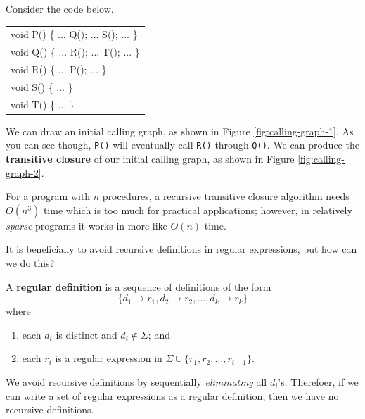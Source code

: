 \begin{example}
    Consider the code below.
    \begin{center}
        \ttfamily
        \begin{tabular}{l}
            \toprule
            void P() \{ ... Q(); ... S(); ... \} \\
            void Q() \{ ... R(); ... T(); ... \} \\
            void R() \{ ... P(); ... \} \\
            void S() \{ ... \} \\
            void T() \{ ... \} \\
            \bottomrule
        \end{tabular}
    \end{center}
    We can draw an initial calling graph, as shown in Figure 
    \ref{fig:calling-graph-1}.
    As you can see though, \texttt{P()} will eventually call \texttt{R()}
    through \texttt{Q()}.
    We can produce the \textbf{transitive closure} of our initial calling graph,
    as shown in Figure \ref{fig:calling-graph-2}.
\end{example}

For a program with $n$ procedures, a recursive transitive closure algorithm
needs $O(n^3)$ time which is too much for practical applications;
however, in relatively \emph{sparse} programs it works in more like $O(n)$
time.

It is beneficially to avoid recursive definitions in regular expressions,
but how can we do this?

\begin{definition}
    A \textbf{regular definition} is a sequence of definitions of the
    form
    \[ \{d_1 \to r_1, d_2 \to r_2, \ldots, d_k \to r_k\} \]
    where
    \begin{enumerate}
        \item each $d_i$ is distinct and $d_i \not \in \Sigma$; and
        \item each $r_i$ is a regular expression in 
            $\Sigma \cup \{r_1, r_2, \ldots, r_{i - 1}\}$.
    \end{enumerate}
\end{definition}

We avoid recursive definitions by sequentially \emph{eliminating} all $d_i$'s.
Therefoer, if we can write a set of regular expressions as a regular definition,
then we have no recursive definitions.
